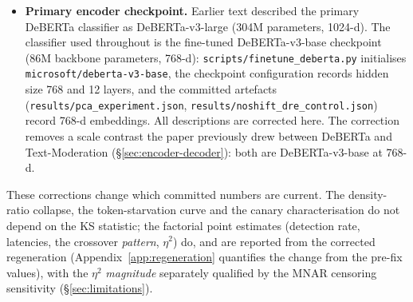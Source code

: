 \documentclass{article}
\begin{document}
\begin{itemize}
\item \textbf{Primary encoder checkpoint.} Earlier text described the primary DeBERTa classifier as DeBERTa-v3-large (304M parameters, 1024-d). The classifier used throughout is the fine-tuned DeBERTa-v3-base checkpoint (86M backbone parameters, 768-d): \texttt{scripts/finetune\_deberta.py} initialises \texttt{microsoft/deberta-v3-base}, the checkpoint configuration records hidden size 768 and 12 layers, and the committed artefacts (\texttt{results/pca\_experiment.json}, \texttt{results/noshift\_dre\_control.json}) record 768-d embeddings. All descriptions are corrected here. The correction removes a scale contrast the paper previously drew between DeBERTa and Text-Moderation (\S\ref{sec:encoder-decoder}): both are DeBERTa-v3-base at 768-d.
\end{itemize}
These corrections change which committed numbers are current. The density-ratio collapse, the token-starvation curve and the canary characterisation do not depend on the KS statistic; the factorial point estimates (detection rate, latencies, the crossover \emph{pattern}, $\eta^2$) do, and are reported from the corrected regeneration (Appendix~\ref{app:regeneration} quantifies the change from the pre-fix values), with the $\eta^2$ \emph{magnitude} separately qualified by the MNAR censoring sensitivity (\S\ref{sec:limitations}).
\end{document}

